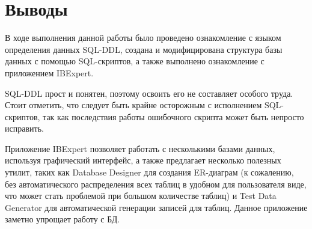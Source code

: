 \section{Выводы}

В ходе выполнения данной работы было проведено ознакомление с языком определения данных SQL-DDL, создана и модифицирована структура базы данных с помощью SQL-скриптов, а также выполнено ознакомление с приложением IBExpert. 

SQL-DDL прост и понятен, поэтому освоить его не составляет особого труда. Стоит отметить, что следует быть крайне осторожным с исполнением SQL-скриптов, так как последствия работы ошибочного скрипта может быть непросто исправить.

Приложение IBExpert позволяет работать с несколькими базами данных, используя графический интерфейс, а также предлагает несколько полезных утилит, таких как Database Designer для создания ER-диаграм (к сожалению, без автоматического распределения всех таблиц в удобном для пользователя виде, что может стать проблемой при большом количестве таблиц) и Test Data Generator для автоматической генерации записей для таблиц. Данное приложение заметно упрощает работу с БД.